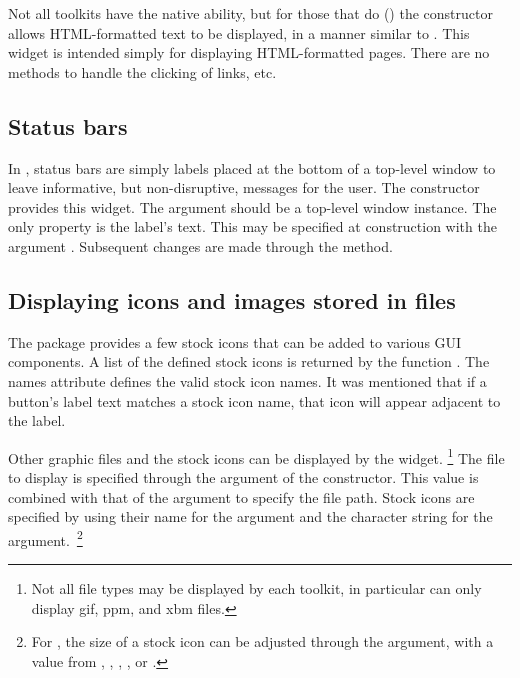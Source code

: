 Not all toolkits have the native ability, but for those that do (\Qt) the
 constructor allows HTML-formatted text to be
displayed, in a manner similar to . This widget is
intended simply for displaying HTML-formatted pages. There are no
methods to handle the clicking of links, etc.

\subsection{Status bars}
\label{sec:gWidgets-statusbars}

In , status bars are simply labels placed at the bottom of a
top-level window to leave informative, but non-disruptive, messages
for the user.  The  constructor provides this
widget.  The  argument should be a top-level window
instance.  The only property is the label's text. This may be
specified at construction with the argument
. Subsequent changes are made through the
 method.




\subsection{Displaying icons and images stored in files}
\label{sec:gWidgets-displ-icons-imag}

The  package provides a few stock icons that can be
added to various GUI components. A list of the defined stock icons is
returned by the function .  The names attribute
defines the valid stock icon names. It was mentioned that if a
button's label text matches a stock icon name, that icon will appear
adjacent to the label.



Other graphic files and the stock icons can be displayed by the
 widget. \footnote{Not all file types may be
  displayed by each toolkit, in particular  can
  only display gif, ppm, and xbm files.} The file to display is
specified through the  argument of the
constructor. This value is combined with that of the
 argument to specify the file path.  Stock
icons are specified by using their name for the 
argument and the character string  for the
 argument.~\footnote{For , the size
  of a stock icon can be adjusted through the 
  argument, with a value from , ,
  , , or .}

